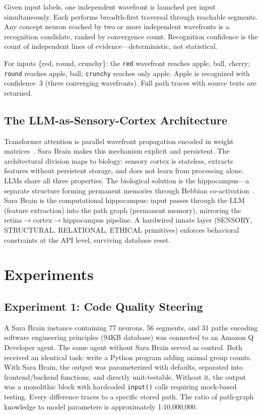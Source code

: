 \documentclass[runningheads]{llncs}
\begin{document}
Given input labels, one independent wavefront is launched per input simultaneously. Each performs breadth-first traversal through reachable segments. Any concept neuron reached by two or more independent wavefronts is a recognition candidate, ranked by convergence count. Recognition confidence is the count of independent lines of evidence---deterministic, not statistical.

For inputs \{red, round, crunchy\}: the \texttt{red} wavefront reaches apple, ball, cherry; \texttt{round} reaches apple, ball; \texttt{crunchy} reaches only apple. Apple is recognized with confidence~3 (three converging wavefronts). Full path traces with source texts are returned.

\subsection{The LLM-as-Sensory-Cortex Architecture}

Transformer attention is parallel wavefront propagation encoded in weight matrices~\cite{ramsauer2021}. Sara Brain makes this mechanism explicit and persistent. The architectural division maps to biology: sensory cortex is stateless, extracts features without persistent storage, and does not learn from processing alone. LLMs share all three properties. The biological solution is the hippocampus---a separate structure forming permanent memories through Hebbian co-activation~\cite{hebb1949}. Sara Brain is the computational hippocampus: input passes through the LLM (feature extraction) into the path graph (permanent memory), mirroring the retina$\rightarrow$cortex$\rightarrow$hippocampus pipeline. A hardwired innate layer (SENSORY, STRUCTURAL, RELATIONAL, ETHICAL primitives) enforces behavioral constraints at the API level, surviving database reset.

\section{Experiments}

\subsection{Experiment 1: Code Quality Steering}

A Sara Brain instance containing 77 neurons, 56 segments, and 31 paths encoding software engineering principles (94KB database) was connected to an Amazon Q Developer agent. The same agent without Sara Brain served as control. Both received an identical task: write a Python program adding animal group counts. With Sara Brain, the output was parameterized with defaults, separated into frontend/backend functions, and directly unit-testable. Without it, the output was a monolithic block with hardcoded \texttt{input()} calls requiring mock-based testing. Every difference traces to a specific stored path. The ratio of path-graph knowledge to model parameters is approximately 1:10,000,000.
\end{document}
